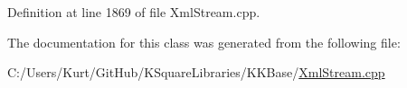 Definition at line 1869 of file Xml\+Stream.\+cpp.



The documentation for this class was generated from the following file\+:\begin{DoxyCompactItemize}
\item 
C\+:/\+Users/\+Kurt/\+Git\+Hub/\+K\+Square\+Libraries/\+K\+K\+Base/\hyperlink{_xml_stream_8cpp}{Xml\+Stream.\+cpp}\end{DoxyCompactItemize}
